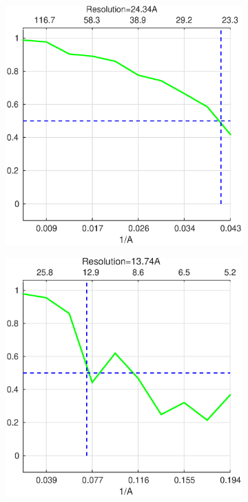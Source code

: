 \documentclass[12pt]{article}
\newcommand{\1}{\mathbf{1}}
\theoremstyle{plain}
\theoremstyle{definition}
\theoremstyle{remark}
\theoremstyle{plain}
\theoremstyle{remark}
\theoremstyle{plain}
\theoremstyle{plain}
\begin{document}
\begin{figure}[t!]
	\centering
	\begin{subfigure}[t]{0.4\textwidth}
		\centering
		\includegraphics[scale=0.35]{TRPV1_trunc_FSC.eps}
		\caption{}
	\end{subfigure} \hfill %
	\begin{subfigure}[t]{0.4\textwidth}
		\centering
		\includegraphics[scale=0.35]{BPTI_FSC.eps}

\end{subfigure}
\end{figure}
\end{document}
